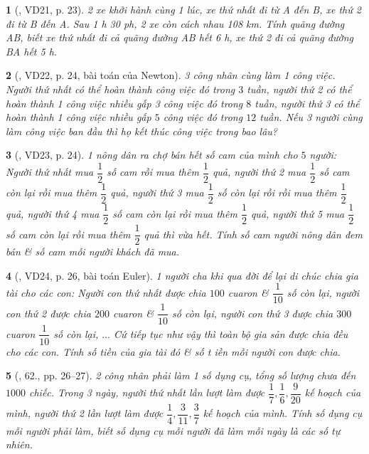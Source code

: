 \documentclass{article}
\newtheorem{baitoan}{}
\begin{document}
\begin{baitoan}[\cite{Binh_Toan_6_tap_2}, VD21, p. 23]
	2 xe khởi hành cùng 1 lúc, xe thứ nhất đi từ A đến B, xe thứ 2 đi từ B đến A. Sau {\rm1 h 30 ph}, 2 xe còn cách nhau {\rm108 km}. Tính quãng đường AB, biết xe thứ nhất đi cả quãng đường AB hết {\rm6 h}, xe thứ 2 đi cả quãng đường BA hết {\rm5 h}.
\end{baitoan}

\begin{baitoan}[\cite{Binh_Toan_6_tap_2}, VD22, p. 24, bài toán của Newton]
	3 công nhân cùng làm 1 công việc. Người thứ nhất có thể hoàn thành công việc đó trong $3$ tuần, người thứ 2 có thể hoàn thành 1 công việc nhiều gấp 3 công việc đó trong $8$ tuần, người thứ 3 có thể hoàn thành 1 công việc nhiều gấp $5$ công việc đó trong $12$ tuần. Nếu 3 người cùng làm công việc ban đầu thì họ kết thúc công việc trong bao lâu?
\end{baitoan}

\begin{baitoan}[\cite{Binh_Toan_6_tap_2}, VD23, p. 24]
	1 nông dân ra chợ bán hết số cam của mình cho $5$ người: Người thứ nhất mua $\dfrac{1}{2}$ số cam rồi mua thêm $\dfrac{1}{2}$ quả, người thứ 2 mua $\dfrac{1}{2}$ số cam còn lại rồi mua thêm $\dfrac{1}{2}$ quả, người thứ 3 mua $\dfrac{1}{2}$ số còn lại rồi rồi mua thêm $\dfrac{1}{2}$ quả, người thứ 4 mua $\dfrac{1}{2}$ số cam còn lại rồi mua thêm $\dfrac{1}{2}$ quả, người thứ 5 mua $\dfrac{1}{2}$ số cam còn lại rồi mua thêm $\dfrac{1}{2}$ quả thì vừa hết. Tính số cam người nông dân đem bán \& số cam mỗi người khách đã mua.
\end{baitoan}

\begin{baitoan}[\cite{Binh_Toan_6_tap_2}, VD24, p. 26, bài toán Euler]
	1 người cha khi qua đời để lại di chúc chia gia tài cho các con: Người con thứ nhất được chia $100$ cuaron \& $\dfrac{1}{10}$ số còn lại, người con thứ 2  được chia $200$ cuaron \& $\dfrac{1}{10}$ số còn lại, người con thứ 3 được chia $300$ cuaron $\dfrac{1}{10}$ số còn lại, $\ldots$ Cứ tiếp tục như vậy thì toàn bộ gia sản được chia đều cho các con. Tính số tiền của gia tài đó \& số t iền mỗi người con được chia.
\end{baitoan}

\begin{baitoan}[\cite{Binh_Toan_6_tap_2}, 62., pp. 26--27]
	2 công nhân phải làm 1 số dụng cụ, tổng số lượng chưa đến $1000$ chiếc. Trong 3 ngày, người thứ nhất lần lượt làm được $\dfrac{1}{7},\dfrac{1}{6},\dfrac{9}{20}$ kế hoạch của mình, người thứ 2 lần lượt làm được $\dfrac{1}{4},\dfrac{3}{11},\dfrac{3}{7}$ kế hoạch của mình. Tính số dụng cụ mỗi người phải làm, biết số dụng cụ mỗi người đã làm mỗi ngày là các số tự nhiên.
\end{baitoan}
\end{document}
